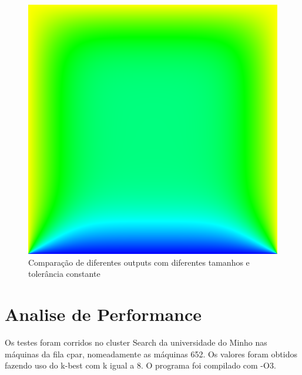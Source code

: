 \documentclass[a4paper]{report}
\begin{document}
\begin{figure}[h]
\begin{minipage}{.3\textwidth}
\end{minipage}
\begin{minipage}{.3\textwidth}
  \centering
  \includegraphics[width=.95\linewidth]{images/poisson_gs_1000.png}
\end{minipage}
    \caption{Comparação de diferentes outputs com diferentes tamanhos e
    tolerância constante}
\end{figure}

\chapter{Analise de Performance}

Os testes foram corridos no cluster Search da universidade do Minho nas máquinas
da fila cpar, nomeadamente as máquinas 652. Os valores foram obtidos fazendo uso
do k-best com k igual a 8. O programa foi compilado com -O3.
\end{document}
